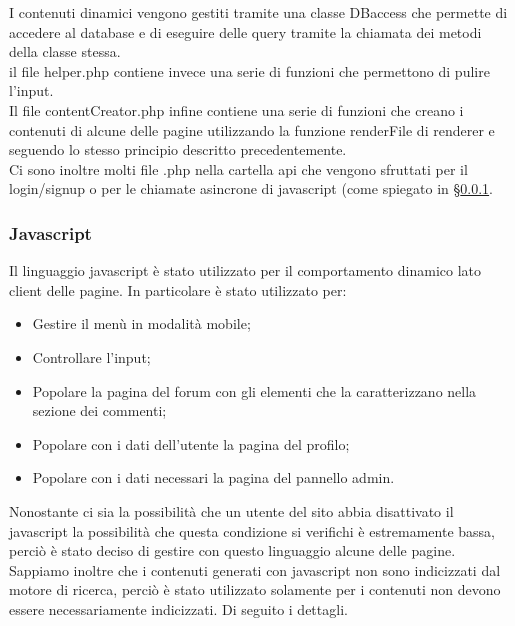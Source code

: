 I contenuti dinamici vengono gestiti tramite una classe DBaccess che permette di accedere al database e di eseguire delle query tramite la chiamata dei metodi della classe stessa.\\
il file helper.php contiene invece una serie di funzioni che permettono di pulire l'input.\\
Il file contentCreator.php infine contiene una serie di funzioni che creano i contenuti di alcune delle pagine utilizzando la funzione renderFile di renderer e seguendo lo stesso principio descritto precedentemente.\\

Ci sono inoltre molti file .php nella cartella api che vengono sfruttati per il login/signup o per le chiamate asincrone di javascript (come spiegato in \S\ref{subs:js}.








\subsubsection{Javascript}\label{subs:js}

Il linguaggio javascript è stato utilizzato per il comportamento dinamico lato client delle pagine. In particolare è stato utilizzato per: 

\begin{itemize}
    
	\item Gestire il menù in modalità mobile;
    \item Controllare l'input;
	\item Popolare la pagina del forum con gli elementi che la caratterizzano nella sezione dei commenti;
	\item Popolare con i dati dell'utente la pagina del profilo;
	\item Popolare con i dati necessari la pagina del pannello admin.
	
\end{itemize}

Nonostante ci sia la possibilità che un utente del sito abbia disattivato il javascript la possibilità che questa condizione si verifichi è estremamente bassa, perciò è stato deciso di gestire con questo linguaggio alcune delle pagine. 
Sappiamo inoltre che i contenuti generati con javascript non sono indicizzati dal motore di ricerca, perciò è stato utilizzato solamente per i contenuti non devono essere necessariamente indicizzati. Di seguito i dettagli.

